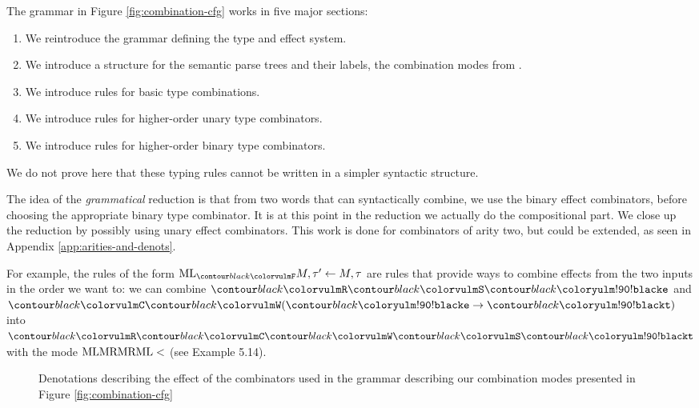 The grammar in Figure \ref{fig:combination-cfg} works in five major sections:
\begin{enumerate}
	\item We reintroduce the grammar defining the type and effect system.
	\item We introduce a structure for the semantic parse trees and their labels,
	      the combination modes from
	      \cite{bumfordEffectdrivenInterpretationFunctors2025}.
	\item We introduce rules for basic type combinations.
	\item We introduce rules for higher-order unary type combinators.
	\item We introduce rules for higher-order binary type combinators.
\end{enumerate}
We do not prove here that these typing rules cannot be written in a simpler
syntactic structure.

\medskip

The idea of the \emph{grammatical} reduction is that from two words that can
syntactically combine, we use the binary effect combinators, before choosing
the appropriate binary type combinator.
It is at this point in the reduction we actually do the compositional part.
We close up the reduction by possibly using unary effect combinators.
This work is done for combinators of arity two, but could be extended, as seen
in Appendix \ref{app:arities-and-denots}.

For example, the rules of the form $\combML_{\f{F}} M, \tau' \gets M, \tau$ are
rules that provide ways to combine effects from the two inputs in the order we
want to: we can combine $\f{R}\f{S}\e$ and $\f{C}\f{W}(\e \to \t)$ into
$\f{R}\f{C}\f{W}\f{S}\t$ with the mode $\text{ML}\text{MR}\text{MR}\text{ML} <$ (see
\cite{bumfordEffectdrivenInterpretationFunctors2025} Example 5.14).

\begin{figure}
	\centering
	\caption{Denotations describing the effect of the combinators used in the
		grammar describing our combination modes presented in
		Figure \ref{fig:combination-cfg}}
	\label{fig:combinator-denotations}
\end{figure}

